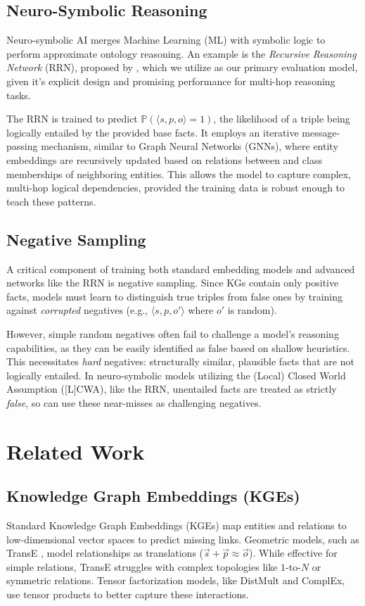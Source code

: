 \documentclass{IOS-Book-Article}     %
\renewcommand{\P}{\mathbb{P}}
\newcommand{\gen}[1]{\langle #1 \rangle}
\begin{document}
\subsection{Neuro-Symbolic Reasoning}
Neuro-symbolic AI merges Machine Learning (ML) with symbolic logic to perform approximate ontology reasoning. An example is the \textit{Recursive Reasoning Network} (RRN), proposed by \cite{hohenecker2020ontology}, which we utilize as our primary evaluation model, given it's explicit design and promising performance for multi-hop reasoning tasks.

The RRN is trained to predict $\P(\gen{s,p,o} = 1)$, the likelihood of a triple being logically entailed by the provided base facts. It employs an iterative message-passing mechanism, similar to Graph Neural Networks (GNNs), where entity embeddings are recursively updated based on relations between and class memberships of neighboring entities. This allows the model to capture complex, multi-hop logical dependencies, provided the training data is robust enough to teach these patterns.

\subsection{Negative Sampling}
A critical component of training both standard embedding models and advanced networks like the RRN is negative sampling. Since KGs contain only positive facts, models must learn to distinguish true triples from false ones by training against \textit{corrupted} negatives (e.g., $\gen{s, p, o'}$ where $o'$ is random).

However, simple random negatives often fail to challenge a model's reasoning capabilities, as they can be easily identified as false based on shallow heuristics. This necessitates \textit{hard} negatives: structurally similar, plausible facts that are not logically entailed. In neuro-symbolic models utilizing the (Local) Closed World Assumption ([L]CWA), like the RRN, unentailed facts are treated as strictly \textit{false}, so can use these near-misses as challenging negatives.

\section{Related Work}
\label{sec:related_work}

\subsection{Knowledge Graph Embeddings (KGEs)}
Standard Knowledge Graph Embeddings (KGEs) map entities and relations to low-dimensional vector spaces to predict missing links. Geometric models, such as TransE \cite{transe}, model relationships as translations ($\vec{s} + \vec{p} \approx \vec{o}$). While effective for simple relations, TransE struggles with complex topologies like $1$-to-$N$ or symmetric relations. Tensor factorization models, like DistMult \cite{distmult} and ComplEx, use tensor products to better capture these interactions.
\end{document}
